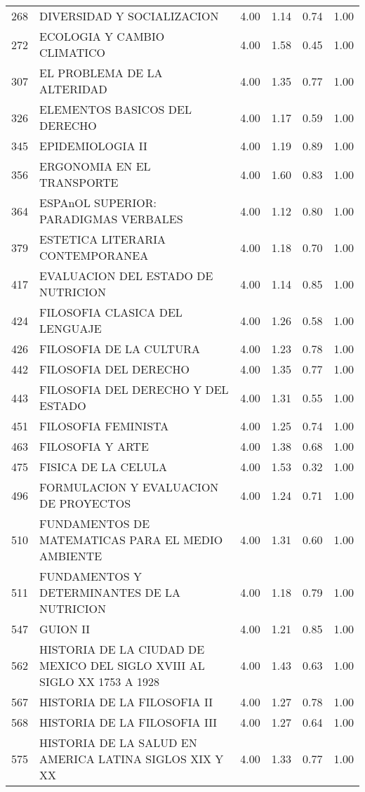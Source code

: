 \documentclass[12pt]{article}
\begin{document}
\begin{table}[ht]
\begin{tabular}{rlrrrr}
  268 & DIVERSIDAD Y SOCIALIZACION & 4.00 & 1.14 & 0.74 & 1.00 \\ 
  272 & ECOLOGIA Y CAMBIO CLIMATICO & 4.00 & 1.58 & 0.45 & 1.00 \\ 
  307 & EL PROBLEMA DE LA ALTERIDAD & 4.00 & 1.35 & 0.77 & 1.00 \\ 
  326 & ELEMENTOS BASICOS DEL DERECHO & 4.00 & 1.17 & 0.59 & 1.00 \\ 
  345 & EPIDEMIOLOGIA II & 4.00 & 1.19 & 0.89 & 1.00 \\ 
  356 & ERGONOMIA EN EL TRANSPORTE & 4.00 & 1.60 & 0.83 & 1.00 \\ 
  364 & ESPAnOL SUPERIOR: PARADIGMAS VERBALES & 4.00 & 1.12 & 0.80 & 1.00 \\ 
  379 & ESTETICA LITERARIA CONTEMPORANEA & 4.00 & 1.18 & 0.70 & 1.00 \\ 
  417 & EVALUACION DEL ESTADO DE NUTRICION & 4.00 & 1.14 & 0.85 & 1.00 \\ 
  424 & FILOSOFIA CLASICA DEL LENGUAJE & 4.00 & 1.26 & 0.58 & 1.00 \\ 
  426 & FILOSOFIA DE LA CULTURA & 4.00 & 1.23 & 0.78 & 1.00 \\ 
  442 & FILOSOFIA DEL DERECHO & 4.00 & 1.35 & 0.77 & 1.00 \\ 
  443 & FILOSOFIA DEL DERECHO Y DEL ESTADO & 4.00 & 1.31 & 0.55 & 1.00 \\ 
  451 & FILOSOFIA FEMINISTA & 4.00 & 1.25 & 0.74 & 1.00 \\ 
  463 & FILOSOFIA Y ARTE & 4.00 & 1.38 & 0.68 & 1.00 \\ 
  475 & FISICA DE LA CELULA & 4.00 & 1.53 & 0.32 & 1.00 \\ 
  496 & FORMULACION Y EVALUACION DE PROYECTOS & 4.00 & 1.24 & 0.71 & 1.00 \\ 
  510 & FUNDAMENTOS DE MATEMATICAS PARA EL MEDIO AMBIENTE & 4.00 & 1.31 & 0.60 & 1.00 \\ 
  511 & FUNDAMENTOS Y DETERMINANTES DE LA NUTRICION & 4.00 & 1.18 & 0.79 & 1.00 \\ 
  547 & GUION II & 4.00 & 1.21 & 0.85 & 1.00 \\ 
  562 & HISTORIA DE LA CIUDAD DE MEXICO DEL SIGLO XVIII AL SIGLO XX 1753 A 1928 & 4.00 & 1.43 & 0.63 & 1.00 \\ 
  567 & HISTORIA DE LA FILOSOFIA II & 4.00 & 1.27 & 0.78 & 1.00 \\ 
  568 & HISTORIA DE LA FILOSOFIA III & 4.00 & 1.27 & 0.64 & 1.00 \\ 
  575 & HISTORIA DE LA SALUD EN AMERICA LATINA SIGLOS XIX Y XX & 4.00 & 1.33 & 0.77 & 1.00 \\ 

\end{tabular}
\end{table}
\end{document}
